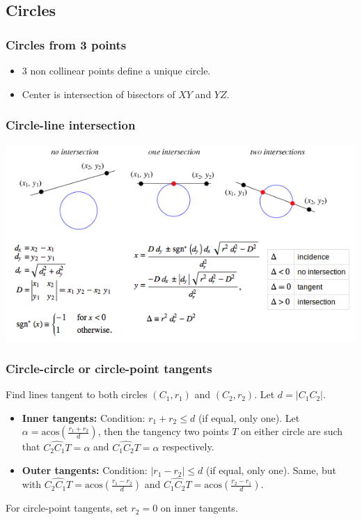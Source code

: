 \subsection{Circles}

\subsubsection{Circles from 3 points}
\begin{itemize}
\item 3 non collinear points define a unique circle.
\item Center is intersection of bisectors of $XY$ and $YZ$. 
\end{itemize}

\subsubsection{Circle-line intersection}
\begin{center}
\includegraphics[scale=0.45]{geo/circleLine.png}
\end{center}

\subsubsection{Circle-circle or circle-point tangents}
\newcommand{\acos}{\mbox{acos}}
Find lines tangent to both circles $(C_1,r_1)$ and $(C_2,r_2)$. Let $d = |C_1C_2|$.
\begin{itemize}
\item{\bf Inner tangents:} Condition: $r_1+r_2 \leq d$ (if equal, only one). Let $\alpha = \acos(\frac{r_1+r_2}{d})$, then the tangency two points $T$ on either circle are such that $\widehat{C_2C_1T}=\alpha$ and $\widehat{C_1C_2T}=\alpha$ respectively.
\item{\bf Outer tangents:} Condition: $|r_1-r_2| \leq d$ (if equal, only one). Same, but with $\widehat{C_2C_1T}=\acos(\frac{r_1-r_2}{d})$ and $\widehat{C_1C_2T}=\acos(\frac{r_2-r_1}{d})$.
\end{itemize}
For circle-point tangents, set $r_2=0$ on inner tangents.

